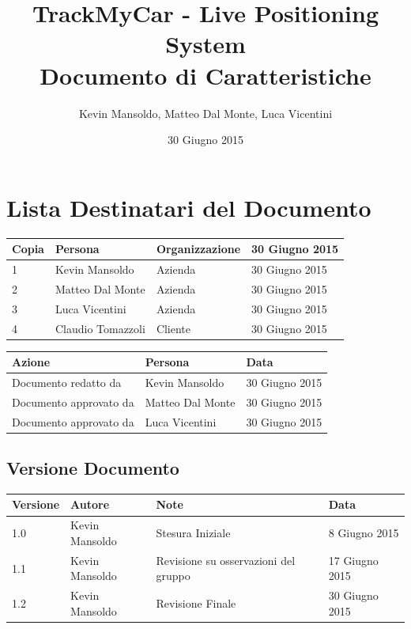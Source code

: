 \documentclass[a4paper,12pt]{article}
\begin{document}
\title{\textbf{TrackMyCar - Live Positioning System}\\Documento di Caratteristiche}

\author{Kevin Mansoldo, Matteo Dal Monte, Luca Vicentini}
\date{30 Giugno 2015}
\maketitle
\pagebreak

\tableofcontents
\pagebreak

\section{Lista Destinatari del Documento}

\begin{table}[ht]
\begin{center}
\begin{tabular}{p{1cm} p{4.5cm} p{3.5cm} p{3.5cm}}
\rowcolor{Ash}
\hline
Copia & Persona & Organizzazione & 30 Giugno 2015 \\ \hline
1 & Kevin Mansoldo & Azienda & 30 Giugno 2015 \\ 
2 & Matteo Dal Monte & Azienda & 30 Giugno 2015 \\ 
3 & Luca Vicentini & Azienda & 30 Giugno 2015 \\ 
4 & Claudio Tomazzoli & Cliente & 30 Giugno 2015 \\ \hline
\end{tabular}
\end{center}


\begin{center}
\begin{tabular}{p{6cm} p{3.5cm} p{3.5cm}}
\rowcolor{Ash}
\hline
Azione & Persona & Data \\ \hline
Documento redatto da & Kevin Mansoldo & 30 Giugno 2015 \\ 
Documento approvato da & Matteo Dal Monte & 30 Giugno 2015 \\ 
Documento approvato da & Luca Vicentini & 30 Giugno 2015 \\ \hline
\end{tabular}
\end{center}
\end{table}

\subsection{Versione Documento}
\begin{table}[ht]
\begin{center}
\begin{tabular}{p{1cm} p{3cm} p{5cm} p{3.5cm}}
\rowcolor{Ash}
\hline
Versione & Autore & Note & Data \\ \hline
1.0 & Kevin Mansoldo & Stesura Iniziale & 8 Giugno 2015 \\ 
1.1 & Kevin Mansoldo & Revisione su osservazioni del gruppo & 17 Giugno 2015 \\ 
1.2 & Kevin Mansoldo & Revisione Finale & 30 Giugno 2015 \\ \hline
\end{tabular}
\end{center}
\end{table}
\end{document}
